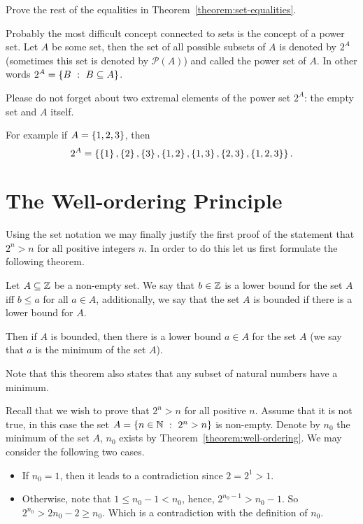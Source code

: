 \begin{exercise}
\label{exercise:set-equalities}
  Prove the rest of the equalities in Theorem~\ref{theorem:set-equalities}.
\end{exercise}

Probably the most difficult concept connected to sets is
the concept of a power set. Let $A$ be some set, then the set of
all possible subsets of $A$ is denoted by $2^A$ (sometimes this set is denoted
by $\mathcal{P}(A)$) and called the power set of $A$. In other words $2^A =
\set[B \subseteq A]{B}$.

\begin{warning}
  Please do not forget about two extremal elements of the power set $2^A$: the
  empty set and $A$ itself.
\end{warning}

\noindent For example if $A = \set{1, 2, 3}$, then $$2^A = \set{\set{1},
\set{2}, \set{3}, \set{1, 2}, \set{1, 3}, \set{2, 3}, \set{1, 2, 3}}.$$

\section{The Well-ordering Principle}
Using the set notation we may finally justify the first proof of the statement
that $2^n > n$ for all positive integers $n$. In order to do this let us first
formulate the following theorem.
\begin{theorem}
\label{theorem:well-ordering}
  Let $A \subseteq \mathbb{Z}$ be a non-empty set. We say that $b \in \mathbb{Z}$ is a lower
  bound for the set $A$ iff $b \le a$ for all $a \in A$, additionally, we say
  that the set $A$ is bounded if there is a lower bound for $A$.

  Then if $A$ is bounded, then there is a lower bound $a \in A$ for the set $A$
  (we say that $a$ is the minimum of the set $A$).
\end{theorem}
Note that this theorem also states that any subset of natural numbers have a
minimum.

Recall that we wish to prove that $2^n > n$ for all positive $n$.
Assume that it is not true, in this case the set
$A = \set[2^n > n]{n \in \N}$ is non-empty. Denote by $n_0$ the minimum of the
set $A$, $n_0$ exists by Theorem~\ref{theorem:well-ordering}. We may consider
the following two cases.
\begin{itemize}
  \item If $n_0 = 1$, then it leads to a contradiction since $2 = 2^1 > 1$.
  \item Otherwise, note that $1 \le n_0 - 1 < n_0$, hence,
    $2^{n_0 - 1} > n_0 - 1$. So $2^{n_0} > 2n_0 - 2 \ge n_0$. Which is a
    contradiction with the definition of $n_0$.
\end{itemize}

